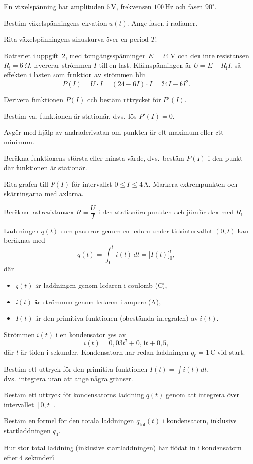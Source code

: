 En växelspänning har amplituden $5\,\text{V}$, frekvensen $100\,\text{Hz}$ och fasen
$90^{\circ}$.
\begin{parts}
  \item Bestäm växelspänningens ekvation $u(t)$. Ange fasen i radianer.
  \item Rita växelspänningens sinuskurva över en period $T$.
\end{parts}

Batteriet i \hyperref[ot:u:2]{uppgift~2}, med tomgångsspänningen $E = 24\,\text{V}$ och den inre
resistansen $R_{\text{i}} = 6\,\Omega$, levererar strömmen $I$ till en last. Klämspänningen är
$U = E - R_{\text{i}} I$, så effekten i lasten som funktion av strömmen blir
\[
  P(I) = U \cdot I = (24 - 6I) \cdot I = 24I - 6I^2.
\]
\begin{parts}
  \item Derivera funktionen $P(I)$ och bestäm uttrycket för $P'(I)$.
  \item Bestäm var funktionen är stationär, dvs.\ lös $P'(I) = 0$.
  \item Avgör med hjälp av andraderivatan om punkten är ett maximum eller ett minimum.
  \item Beräkna funktionens största eller minsta värde, dvs.\ bestäm $P(I)$ i den punkt där
    funktionen är stationär.
  \item Rita grafen till $P(I)$ för intervallet $0 \leq I \leq 4\,\text{A}$. Markera
    extrempunkten och skärningarna med axlarna.
  \item Beräkna lastresistansen $R = \dfrac{U}{I}$ i den stationära punkten och jämför den med
    $R_{\text{i}}$.
\end{parts}

Laddningen $q(t)$ som passerar genom en ledare under tidsintervallet $(0, t)$ kan beräknas med
\[
  q(t) = \int_0^t i(t)\,dt = \bigl[I(t)\bigr]_0^t,
\]
där
\begin{itemize}
  \item $q(t)$ är laddningen genom ledaren i coulomb (C),
  \item $i(t)$ är strömmen genom ledaren i ampere (A),
  \item $I(t)$ är den primitiva funktionen (obestämda integralen) av $i(t)$.
\end{itemize}
Strömmen $i(t)$ i en kondensator ges av
\[
  i(t) = 0{,}03t^2 + 0{,}1t + 0{,}5,
\]
där $t$ är tiden i sekunder. Kondensatorn har redan laddningen $q_0 = 1\,\text{C}$ vid start.
\begin{parts}
  \item Bestäm ett uttryck för den primitiva funktionen $I(t) = \int i(t)\,dt$, dvs.\ integrera
    utan att ange några gränser.
  \item Bestäm ett uttryck för kondensatorns laddning $q(t)$ genom att integrera över intervallet
    $[0, t]$.
  \item Bestäm en formel för den totala laddningen $q_{\text{tot}}(t)$ i kondensatorn, inklusive
    startladdningen $q_0$.
  \item Hur stor total laddning (inklusive startladdningen) har flödat in i kondensatorn efter
    $4$ sekunder?
\end{parts}

